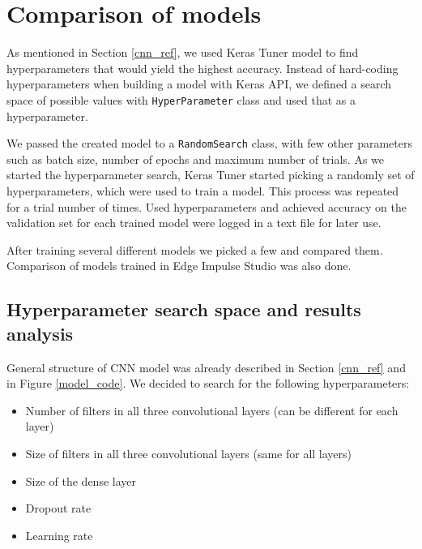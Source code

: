 \section{ Comparison of models}\label{model_comparisons}

As mentioned in Section \ref{cnn_ref}, we used Keras Tuner model to find hyperparameters that would yield the highest accuracy.
Instead of hard-coding hyperparameters when building a model with Keras API, we defined a search space of possible values with \verb|HyperParameter| class and used that as a hyperparameter.

We passed the created model to a \verb|RandomSearch| class, with few other parameters such as batch size, number of epochs and maximum number of trials.
As we started the hyperparameter search, Keras Tuner started picking a randomly set of hyperparameters, which were used to train a model.
This process was repeated for a trial number of times.
Used hyperparameters and achieved accuracy on the validation set for each trained model were logged in a text file for later use.

After training several different models we picked a few and compared them.
Comparison of models trained in Edge Impulse Studio was also done.


\subsection{ Hyperparameter search space and results analysis}

General structure of CNN model was already described in Section \ref{cnn_ref} and in Figure \ref{model_code}.
We decided to search for the following hyperparameters: 

\begin{itemize}
    \item Number of filters in all three convolutional layers (can be different for each layer)
    \item Size of filters in all three convolutional layers (same for all layers)
    \item Size of the dense layer
    \item Dropout rate 
    \item Learning rate
\end{itemize}

